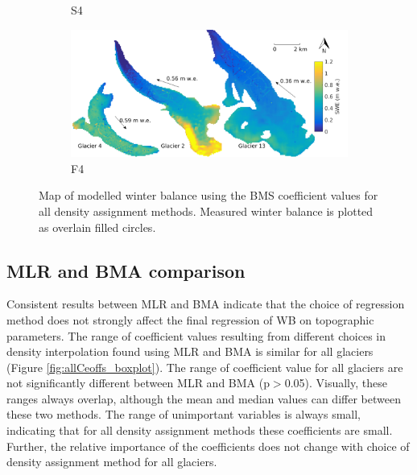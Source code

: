 \documentclass{sfuthesis}
\begin{document}
\begin{figure}[H]
\begin{subfigure}[b]{0.475\textwidth}
            \caption[]%
            {{\small S4}}    
        \end{subfigure}
        \quad
        \begin{subfigure}[b]{0.475\textwidth}   
            \centering 
            \includegraphics[width=\textwidth]{BMSmap_Modelled_Observed_Opt8.png}
            \caption[]%
            {{\small F4}}    
        \end{subfigure}
              
        \caption[Map of modelled winter balance using the BMS coefficient values for all density assignment methods. Measured winter balance is plotted as overlain filled circles.]
        {\small Map of modelled winter balance using the BMS coefficient values for all density assignment methods. Measured winter balance is plotted as overlain filled circles.} 
        \label{fig:allBMSmodelled}
    \end{figure}




\subsection{MLR and BMA comparison}


Consistent results between MLR and BMA indicate that the choice of regression method does not strongly affect the final regression of WB on topographic parameters. The range of coefficient values resulting from different choices in density interpolation found using MLR and BMA is similar for all glaciers (Figure \ref{fig:allCeoffs_boxplot}). The range of coefficient value for all glaciers are not significantly different between MLR and BMA (p$>$0.05). Visually, these ranges always overlap, although the mean and median values can differ between these two methods. The range of unimportant variables is always small, indicating that for all density assignment methods these coefficients are small. Further, the relative importance of the coefficients does not change with choice of density assignment method for all glaciers. 
\end{document}
